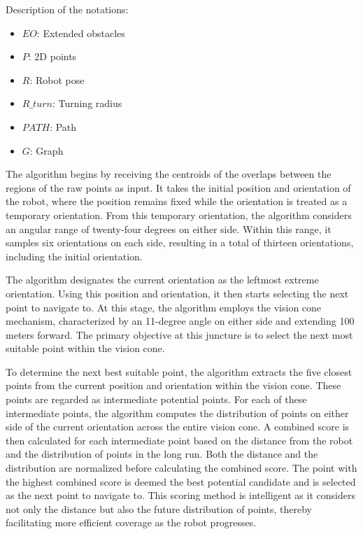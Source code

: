     Description of the notations:
    \begin{itemize}[noitemsep,topsep=0pt]
        \item $EO$: Extended obstacles
        \item $P$: 2D points
        \item $R$: Robot pose
        \item $R\_turn$: Turning radius
        \item $PATH$: Path
        \item $G$: Graph
    \end{itemize}
    


\vspace*{6mm}  
 
The algorithm begins by receiving the centroids of the overlaps between the regions of the raw points as input. It takes the initial position and orientation of the robot, where the position remains fixed while the orientation is treated as a temporary orientation. From this temporary orientation, the algorithm considers an angular range of twenty-four degrees on either side. Within this range, it samples six orientations on each side, resulting in a total of thirteen orientations, including the initial orientation.

\vspace*{6mm}  

The algorithm designates the current orientation as the leftmost extreme orientation. Using this position and orientation, it then starts selecting the next point to navigate to. At this stage, the algorithm employs the vision cone mechanism, characterized by an 11-degree angle on either side and extending 100 meters forward. The primary objective at this juncture is to select the next most suitable point within the vision cone.

\vspace*{6mm}  

To determine the next best suitable point, the algorithm extracts the five closest points from the current position and orientation within the vision cone. These points are regarded as intermediate potential points. For each of these intermediate points, the algorithm computes the distribution of points on either side of the current orientation across the entire vision cone. A combined score is then calculated for each intermediate point based on the distance from the robot and the distribution of points in the long run. Both the distance and the distribution are normalized before calculating the combined score. The point with the highest combined score is deemed the best potential candidate and is selected as the next point to navigate to. This scoring method is intelligent as it considers not only the distance but also the future distribution of points, thereby facilitating more efficient coverage as the robot progresses.

